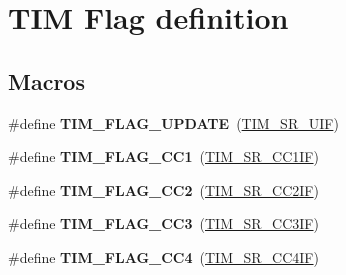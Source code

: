 \hypertarget{group___t_i_m___flag__definition}{}\section{T\+IM Flag definition}
\label{group___t_i_m___flag__definition}
\subsection*{Macros}
\begin{DoxyCompactItemize}
\item 
\mbox{\label{group___t_i_m___flag__definition_gac45ce66cf33b4f324323fc3036917712}} 
\#define {\bfseries T\+I\+M\+\_\+\+F\+L\+A\+G\+\_\+\+U\+P\+D\+A\+TE}~(\mbox{\hyperlink{group___peripheral___registers___bits___definition_gac8c03fabc10654d2a3f76ea40fcdbde6}{T\+I\+M\+\_\+\+S\+R\+\_\+\+U\+IF}})
\item 
\mbox{\label{group___t_i_m___flag__definition_gaa7eb8be054b9bd217a9abb1c8687cc55}} 
\#define {\bfseries T\+I\+M\+\_\+\+F\+L\+A\+G\+\_\+\+C\+C1}~(\mbox{\hyperlink{group___peripheral___registers___bits___definition_ga449a61344a97608d85384c29f003c0e9}{T\+I\+M\+\_\+\+S\+R\+\_\+\+C\+C1\+IF}})
\item 
\mbox{\label{group___t_i_m___flag__definition_ga9cae242f1c51b31839ffc5bc007c82a7}} 
\#define {\bfseries T\+I\+M\+\_\+\+F\+L\+A\+G\+\_\+\+C\+C2}~(\mbox{\hyperlink{group___peripheral___registers___bits___definition_ga25a48bf099467169aa50464fbf462bd8}{T\+I\+M\+\_\+\+S\+R\+\_\+\+C\+C2\+IF}})
\item 
\mbox{\label{group___t_i_m___flag__definition_ga052c380f922219659810e4fceb574a7c}} 
\#define {\bfseries T\+I\+M\+\_\+\+F\+L\+A\+G\+\_\+\+C\+C3}~(\mbox{\hyperlink{group___peripheral___registers___bits___definition_gad3cf234a1059c0a04799e88382cdc0f2}{T\+I\+M\+\_\+\+S\+R\+\_\+\+C\+C3\+IF}})
\item 
\mbox{\label{group___t_i_m___flag__definition_gafd0dc57b56941f8b8250d66e289542db}} 
\#define {\bfseries T\+I\+M\+\_\+\+F\+L\+A\+G\+\_\+\+C\+C4}~(\mbox{\hyperlink{group___peripheral___registers___bits___definition_gacade8a06303bf216bfb03140c7e16cac}{T\+I\+M\+\_\+\+S\+R\+\_\+\+C\+C4\+IF}})

\end{DoxyCompactItemize}
